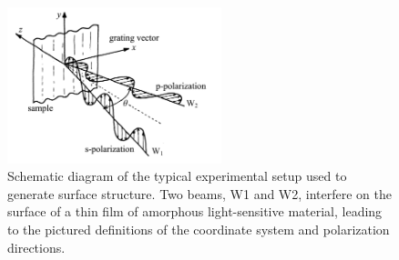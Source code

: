 \documentclass[aps, prl, twocolumn, groupedaddress]{revtex4-1}
\begin{document}
\begin{figure}[!htbp]
  \includegraphics[width=2.45in]{figure/sppic.png}
  \caption{Schematic diagram of the typical experimental setup used to
                                                                                                                                                                                                                                                                                                                                                                                                                                                                                                                                generate surface structure.
                                                                                                                                                                                                                                                                                                                                                                                                                                                                                                                                Two beams, W1 and W2, interfere on the surface of a thin film of
                                                                                                                                                                                                                                                                                                                                                                                                                                                                                                                                amorphous light-sensitive material, leading
                                                                                                                                                                                                                                                                                                                                                                                                                                                                                                                                to the pictured definitions of the coordinate system and polarization directions.}
  \label{fig:setup}
\end{figure}
\end{document}
